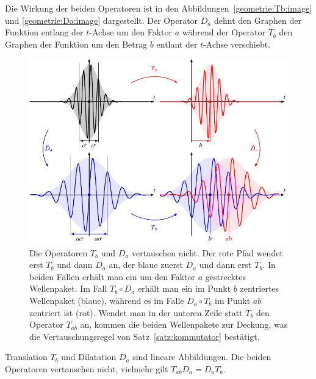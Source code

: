Die Wirkung der beiden Operatoren ist in den
Abbildungen~\ref{geometrie:Tb:image} und \ref{geometrie:Da:image} dargestellt.
Der Operator $D_a$ dehnt den Graphen der Funktion entlang der
$t$-Achse um den Faktor $a$ während der Operator $T_b$ den Graphen
der Funktion um den Betrag $b$ entlant der $t$-Achse verschiebt.

\begin{figure}
\centering
\includegraphics[width=\hsize]{chapters/1-geometrie/images/kommutator.pdf}
\caption{Die Operatoren $T_b$ und $D_a$ vertauschen nicht.
Der rote Pfad wendet erst $T_b$ und dann $D_a$ an, der blaue zuerst
$D_a$ und dann erst $T_b$.
In beiden Fällen erhält man ein um den Faktor $a$ gestrecktes
Wellenpaket.
Im Fall $T_b\circ D_a$ erhält man ein im Punkt $b$ zentriertes Wellenpaket
(blaue), während es im Falle $D_a\circ T_b$ im Punkt $ab$ zentriert ist (rot).
Wendet man in der unteren Zeile statt $T_b$ den Operator $T_{ab}$ an, 
kommen die beiden Wellenpakete zur Deckung, was die Vertauschungsregel
von Satz~\ref{satz:kommutator} bestätigt.
\label{geometrie:kommutator:image}}
\end{figure}

\begin{satz}
\label{satz:kommutator}
Translation $T_b$ und Dilatation $D_a$ sind lineare Abbildungen.
Die beiden Operatoren vertauschen nicht, vielmehr gilt
$T_{ab}D_a = D_aT_b$.
\end{satz}

